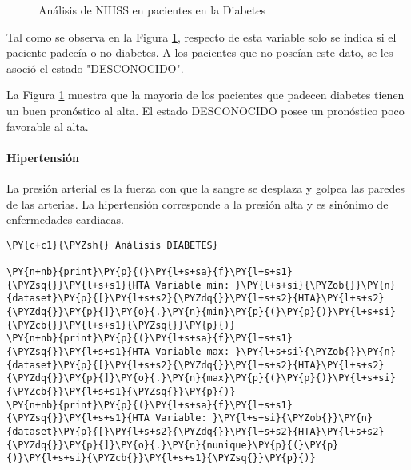 \begin{center}
    	\begin{figure}[H]
	\centering
	\caption{Análisis de NIHSS en pacientes en la Diabetes}
	\label{fig:aNISSd}
	\end{figure}
\end{center}
    
    Tal como se observa en la Figura \ref{fig:aNISSd}, respecto de esta variable solo se indica si el paciente padecía o no diabetes. A los pacientes que no poseían este dato, se les asoció el estado "DESCONOCIDO".
    \par La Figura \ref{fig:aNISSd} muestra que la mayoria de los pacientes que padecen diabetes tienen un buen pronóstico al alta. El estado DESCONOCIDO posee un pronóstico poco favorable al alta.


    \hypertarget{hipertensiuxf3n}{%
\paragraph{Hipertensión}\label{hipertensiuxf3n}}

La presión arterial es la fuerza con que la sangre se desplaza y golpea las paredes de las arterias. La hipertensión corresponde a la presión alta y es sinónimo de enfermedades cardiacas.

    \begin{tcolorbox}[breakable, size=fbox, boxrule=1pt, pad at break*=1mm,colback=cellbackground, colframe=cellborder]
\begin{Verbatim}[commandchars=\\\{\}]
\PY{c+c1}{\PYZsh{} Análisis DIABETES}

\PY{n+nb}{print}\PY{p}{(}\PY{l+s+sa}{f}\PY{l+s+s1}{\PYZsq{}}\PY{l+s+s1}{HTA Variable min: }\PY{l+s+si}{\PYZob{}}\PY{n}{dataset}\PY{p}{[}\PY{l+s+s2}{\PYZdq{}}\PY{l+s+s2}{HTA}\PY{l+s+s2}{\PYZdq{}}\PY{p}{]}\PY{o}{.}\PY{n}{min}\PY{p}{(}\PY{p}{)}\PY{l+s+si}{\PYZcb{}}\PY{l+s+s1}{\PYZsq{}}\PY{p}{)}
\PY{n+nb}{print}\PY{p}{(}\PY{l+s+sa}{f}\PY{l+s+s1}{\PYZsq{}}\PY{l+s+s1}{HTA Variable max: }\PY{l+s+si}{\PYZob{}}\PY{n}{dataset}\PY{p}{[}\PY{l+s+s2}{\PYZdq{}}\PY{l+s+s2}{HTA}\PY{l+s+s2}{\PYZdq{}}\PY{p}{]}\PY{o}{.}\PY{n}{max}\PY{p}{(}\PY{p}{)}\PY{l+s+si}{\PYZcb{}}\PY{l+s+s1}{\PYZsq{}}\PY{p}{)}
\PY{n+nb}{print}\PY{p}{(}\PY{l+s+sa}{f}\PY{l+s+s1}{\PYZsq{}}\PY{l+s+s1}{HTA Variable: }\PY{l+s+si}{\PYZob{}}\PY{n}{dataset}\PY{p}{[}\PY{l+s+s2}{\PYZdq{}}\PY{l+s+s2}{HTA}\PY{l+s+s2}{\PYZdq{}}\PY{p}{]}\PY{o}{.}\PY{n}{nunique}\PY{p}{(}\PY{p}{)}\PY{l+s+si}{\PYZcb{}}\PY{l+s+s1}{\PYZsq{}}\PY{p}{)}
\end{Verbatim}
\end{tcolorbox}

